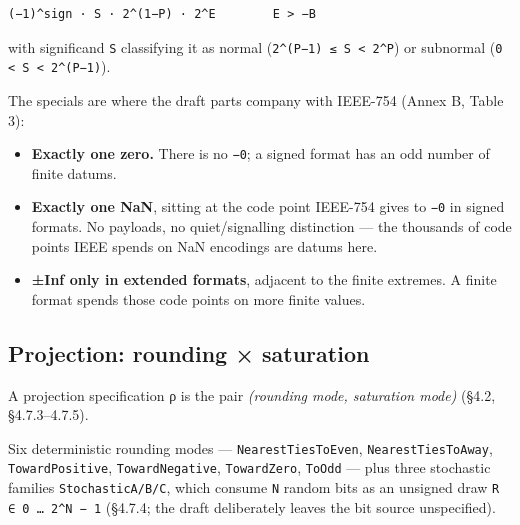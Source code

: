 \begin{verbatim}
(−1)^sign · S · 2^(1−P) · 2^E        E > −B
\end{verbatim}



with significand \texttt{S} classifying it as normal (\texttt{2{\textasciicircum}(P−1) ≤ S < 2{\textasciicircum}P}) or subnormal (\texttt{0 < S < 2{\textasciicircum}(P−1)}).



The specials are where the draft parts company with IEEE-754 (Annex B, Table 3):



\begin{itemize}
\item \textbf{Exactly one zero.} There is no \texttt{−0}; a signed format has an odd number of finite datums.


\item \textbf{Exactly one NaN}, sitting at the code point IEEE-754 gives to \texttt{−0} in signed formats. No payloads, no quiet/signalling distinction — the thousands of code points IEEE spends on NaN encodings are datums here.


\item \textbf{±Inf only in extended formats}, adjacent to the finite extremes. A finite format spends those code points on more finite values.

\end{itemize}


\subsection{Projection: rounding × saturation}



\label{13445344687072648265}{}


A projection specification ρ is the pair \emph{(rounding mode, saturation mode)} (§4.2, §4.7.3–4.7.5).



Six deterministic rounding modes — \texttt{NearestTiesToEven}, \texttt{NearestTiesToAway}, \texttt{TowardPositive}, \texttt{TowardNegative}, \texttt{TowardZero}, \texttt{ToOdd} — plus three stochastic families \texttt{StochasticA/B/C}, which consume \texttt{N} random bits as an unsigned draw \texttt{R ∈ 0 … 2{\textasciicircum}N − 1} (§4.7.4; the draft deliberately leaves the bit source unspecified).



